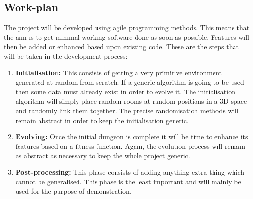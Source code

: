 \documentclass{ueacmpstyle}
\begin{document}
\subsection{Work-plan}
The project will be developed using agile programming methods. This means that the aim is to get minimal working software done as soon as possible. Features will then be added or enhanced based upon existing code. These are the steps that will be taken in the development process:

\begin{enumerate}
\item {\bf Initialisation: } This consists of getting a very primitive environment generated at random from scratch. If a generic algorithm is going to be used then some data must already exist in order to evolve it. The initialisation algorithm will simply place random rooms at random positions in a 3D space and randomly link them together. The precise randomisation methods will remain abstract in order to keep the initialisation generic.
\item {\bf Evolving: } Once the initial dungeon is complete it will be time to enhance its features based on a fitness function. Again, the evolution process will remain as abstract as necessary to keep the whole project generic.
\item {\bf Post-processing: } This phase consists of adding anything extra thing which cannot be generalised. This phase is the least important and will mainly be used for the purpose of demonstration.
\end{enumerate}
\end{document}
